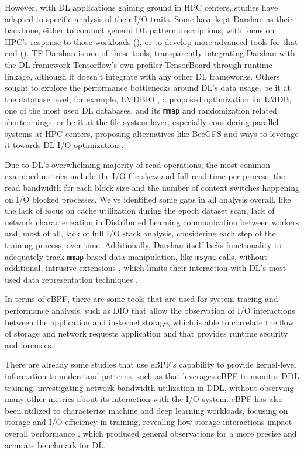 \documentclass[conference]{IEEEtran}
\begin{document}
However, with DL applications gaining ground in HPC centers, studies have adapted to specific analysis of their I/O traits. Some have kept Darshan as their backbone, either to conduct general DL pattern descriptions, with focus on HPC's response to those workloads (\cite{IOHPCDLBOOK,CharacterizationMLIOLeadHPC, UnderstandingDLIOHPC}), or to develop more advanced tools for that end (\cite{DFTracerAIHPC}). TF-Darshan \cite{tfdarshan} is one of those tools, transparently integrating Darshan with the DL framework Tensorflow's own profiler TensorBoard through runtime linkage, although it doesn't integrate with any other DL frameworks. Others sought to explore the performance bottlenecks around DL's data usage, be it at the database level, for example, LMDBIO \cite{LMDB}, a proposed optimization for LMDB, one of the most used DL databases, and its \texttt{mmap} and randomization related shortcomings, or be it at the file system layer, especially considering parallel systems at HPC centers, proposing alternatives like BeeGFS \cite{beegfs} and ways to leverage it towards DL I/O optimization \cite{beegfsDL}.

Due to DL's overwhelming majority of read operations, the most common examined metrics include the I/O file skew and full read time per process; the read bandwidth for each block size and the number of context switches happening on I/O blocked processes. We've identified some gaps in all analysis overall, like the lack of focus on cache utilization during the epoch dataset scan, lack of network characterization in Distributed Learning communication between workers and, most of all, lack of full I/O stack analysis, considering each step of the training process, over time. Additionally, Darshan itself lacks functionality to adequately track \texttt{mmap} based data manipulation, like \texttt{msync} calls, without additional, intrusive extensions \cite{tfdarshan}, which limits their interaction with DL's most used data representation techniques \cite{LMDB}.

In terms of eBPF, there are some tools that are used for system tracing and performance analysis,
such as DIO \cite{DIO} that allow the observation of I/O interactions between the application and in-kernel storage,
\cite{CAT} which is able to correlate the flow of storage and network requests application and \cite{tracee} that provides runtime security and forensics.

There are already some studies that use eBPF's capability to provide kernel-level information to understand patterns, such as \cite{eBPFDLNetwork} that
leverages eBPF to monitor DDL training, investigating network bandwidth utilization in DDL, without observing many other metrics about its interaction with the I/O system.
eBPF has also been utilized to characterize machine and deep learning workloads, focusing on storage and I/O efficiency in training,
revealing how storage interactions impact overall performance \cite{OanaDL, OanaML}, which produced general observations for a more precise and accurate benchmark for DL.
\end{document}
